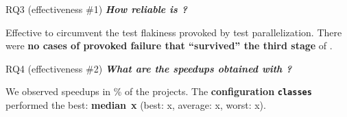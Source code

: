 \documentclass{beamer}
\begin{document}
\begin{frame}{RQ3 (effectiveness \#1)}
	\textbf{\textit{How {\rsm reliable} is \tname?}}
	\begin{center}\pause
		\begin{tcolorbox}
			Effective to circumvent the test flakiness provoked by test parallelization. There were \textbf{\color{red}no cases of provoked failure that ``survived'' the third stage} of \tname.
		\end{tcolorbox}
	\end{center}
\end{frame}

\begin{frame}{RQ4 (effectiveness \#2)}
	\textbf{\textit{What are the {\rsm speedups obtained} with \tname?}}
	\begin{center}\pause
		\begin{tcolorbox}
			We observed speedups in \FrequencySpeedups\% of the projects. The {\color{red}\textbf{configuration} \texttt{\textbf{classes}}} performed the best: {\color{red} \textbf{median}~\textbf{\SpeedupClassesMedian{}x}} (best: \SpeedupClassesMax{}x, average: \SpeedupClassesAvg{}x, worst: \SpeedupClassesMin{}x).
		\end{tcolorbox}
	\end{center}
\end{frame}
\end{document}
